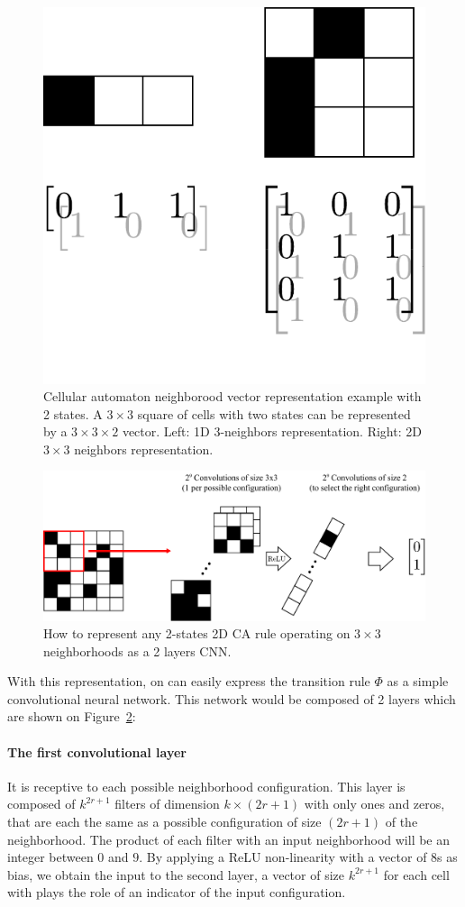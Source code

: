 \begin{figure}[htbp]
  \centering
  \includegraphics[width=.3\linewidth]{figures/repr}
  \caption{\label{fig:cell}Cellular automaton neighborood vector representation
    example with 2 states. A $3\times 3$ square of cells with two states can be
    represented by a $3\times 3 \times 2$ vector. Left: 1D 3-neighbors
    representation. Right: 2D $3\times3$ neighbors representation.}

\end{figure}

\begin{figure}[htbp]
  \centering
  \includegraphics[width=.9\linewidth]{figures/global_schema}
  \caption{\label{fig:global_schema}How to represent any 2-states 2D CA rule
    operating on $3\times 3$ neighborhoods as a 2 layers CNN.}
\end{figure}


With this representation, on can easily express the transition rule $\Phi$ as a
simple convolutional neural network. This network would be composed of 2 layers
which are shown on Figure~\ref{fig:global_schema}:

\paragraph{The first convolutional layer}It is receptive to each possible
neighborhood configuration. This layer is composed of $k^{2r + 1}$ filters of
dimension $k\times (2r + 1)$ with only ones and zeros, that are each the same as
a possible configuration of size $(2r+1)$ of the neighborhood. The product of
each filter with an input neighborhood will be an integer between $0$ and $9$.
By applying a ReLU non-linearity with a vector of 8s as bias, we obtain the
input to the second layer, a vector of size $k^{2r + 1}$ for each cell with
plays the role of an indicator of the input configuration.

